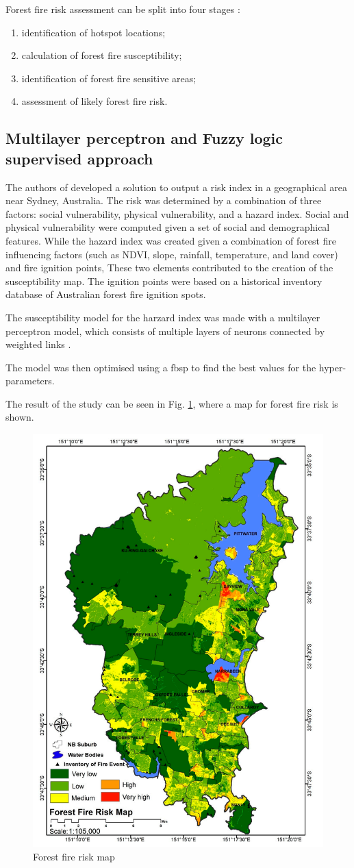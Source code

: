 Forest fire risk assessment can be split into four stages \cite{rs13132513}: 
\begin{enumerate}[label=(\alph*)]
    \item identification of hotspot locations;
    \item calculation of forest fire susceptibility;
    \item identification of forest fire sensitive areas;
    \item assessment of likely forest fire risk.
\end{enumerate}


\subsection{Multilayer perceptron and Fuzzy logic supervised approach}
The authors of \cite{rs13132513} developed a solution to output a risk index in a geographical area near Sydney, Australia. The risk was determined by a combination of three factors: social vulnerability, physical vulnerability, and a hazard index.
Social and physical vulnerability were computed given a set of social and demographical features. While the hazard index was created given a combination of forest fire influencing factors (such as NDVI, slope, rainfall, temperature, and land cover) and fire ignition points, These two elements contributed to the creation of the susceptibility map. The ignition points were based on a historical inventory database of Australian forest fire ignition spots.


The susceptibility model for the harzard index was made with a multilayer perceptron model, which consists of multiple layers of neurons connected by weighted links \cite{bento2020multilayer}.


The model was then optimised using a \gls{fbsp} to find the best values for the hyper-parameters.

The result of the study can be seen in Fig. \ref{fig:ffrpm}, where a map for forest fire risk is shown.

\begin{figure}[htbp]
 \centering
  \includegraphics[width=0.4\linewidth]{frontmatter/imgs/Screenshot from 2023-11-28 11-07-47.png}
  \caption{Forest fire risk map}
  \label{fig:ffrpm}
\end{figure}



